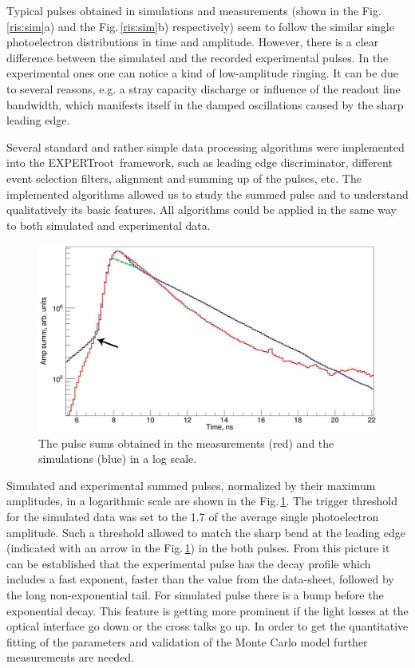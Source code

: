 \documentclass{webofc}
\newcommand{\er}{\textmd{EXPERTroot}}
\newcommand{\red}[1]{\textcolor{red}{#1}}
\begin{document}
Typical pulses obtained in simulations and measurements (shown in the Fig.\,\ref{ris:sim}a) and the Fig.\,\ref{ris:sim}b) respectively) seem to follow the similar single photoelectron distributions in time and amplitude.
However, there is a clear difference between the simulated and the recorded experimental pulses. In the experimental ones one can notice a kind of low-amplitude ringing. It can be due to several reasons, e.g. a stray capacity discharge or influence of the readout line bandwidth, which manifests itself in the damped oscillations caused by the sharp leading edge.

Several standard and rather simple data processing algorithms were implemented into the \er\ framework, such as leading edge discriminator, different event selection filters, alignment and summing up of the pulses, etc. The implemented algorithms allowed us to study the summed pulse and to understand qualitatively its basic features. All algorithms could be applied in the same way to both simulated and experimental data.

\begin{figure}[h]
	\centering
	\includegraphics[width=0.63\linewidth]{summ.png}
	\caption{The pulse sums obtained in the measurements (red) and the simulations (blue) in a log scale.}\label{ris:sum}
\end{figure}



Simulated and experimental summed pulses, normalized by their maximum amplitudes, in a logarithmic scale are shown in the Fig.\,\ref{ris:sum}.
The trigger threshold for the simulated data was set to the 1.7 of the average single photoelectron amplitude.
Such a threshold allowed to match the sharp bend at the leading edge (indicated with an arrow in the Fig.\,\ref{ris:sum}) in the both pulses. From this picture it can be established that the experimental pulse has the decay profile which includes a fast exponent, faster than the value from the data-sheet, followed by the long non-exponential tail. For simulated pulse there is a bump before the exponential decay. This feature is getting more prominent if the light losses at the optical interface go down or the cross talks go up. In order to get the quantitative fitting of the parameters and validation of the Monte Carlo model further measurements are needed. 
\end{document}
